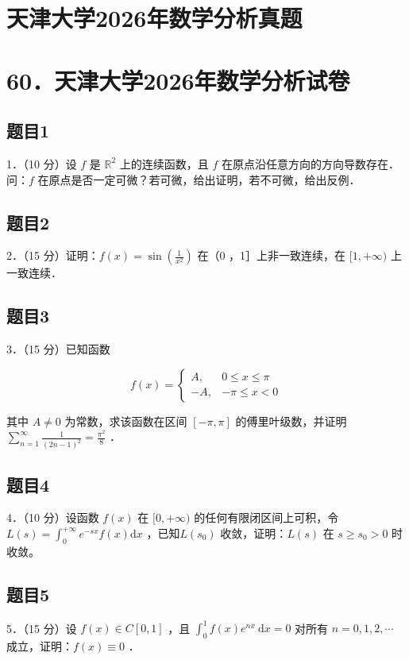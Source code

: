 \documentclass{article}
\begin{document}
\section*{天津大学2026年数学分析真题}
\section*{60．天津大学2026年数学分析试卷}

\subsection{题目1}
1．（10 分）设 \(f\) 是 \(\mathbb{R}^{2}\) 上的连续函数，且 \(f\) 在原点沿任意方向的方向导数存在．问：\(f\) 在原点是否一定可微？若可微，给出证明，若不可微，给出反例．

\subsection{题目2}
2．（15 分）证明：\(f(x)=\sin \left(\frac{1}{x^{2}}\right)\) 在（0 ，1］上非一致连续，在 \([1,+\infty)\) 上一致连续．

\subsection{题目3}
3．（15 分）已知函数

\[
f(x)= \begin{cases}A, & 0 \leq x \leq \pi \\ -A, & -\pi \leq x<0\end{cases}
\]

其中 \(A \neq 0\) 为常数，求该函数在区间 \([-\pi, \pi]\) 的傅里叶级数，并证明 \(\sum_{n=1}^{\infty} \frac{1}{(2 n-1)^{2}}=\frac{\pi^{2}}{8}\) ．

\subsection{题目4}
4．（10 分）设函数 \(f(x)\) 在 \([0,+\infty)\) 的任何有限闭区间上可积，令 \(L(s)=\int_{0}^{+\infty} e^{-s x} f(x) \mathrm{d} x\) ，已知\(L\left(s_{0}\right)\) 收敛，证明：\(L(s)\) 在 \(s \geq s_{0}>0\) 时收敛。

\subsection{题目5}
5．（15 分）设 \(f(x) \in C[0,1]\) ，且 \(\int_{0}^{1} f(x) e^{n x} \mathrm{~d} x=0\) 对所有 \(n=0,1,2, \cdots\) 成立，证明：\(f(x) \equiv 0\) ．
\end{document}
